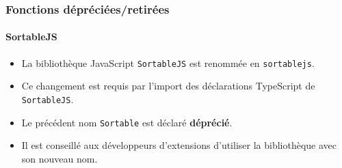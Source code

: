 %

\begin{frame}[fragile]
	\frametitle{Fonctions dépréciées/retirées}
	\framesubtitle{SortableJS}

	\begin{itemize}
		\item La bibliothèque JavaScript \texttt{SortableJS} est renommée en \texttt{sortablejs}.

		\item Ce changement est requis par l'import des déclarations TypeScript
			de \texttt{SortableJS}.

		\item Le précédent nom \texttt{Sortable} est déclaré \textbf{déprécié}.

		\item Il est conseillé aux développeurs d'extensions d'utiliser la bibliothèque avec son nouveau nom.
	\end{itemize}

\end{frame}

